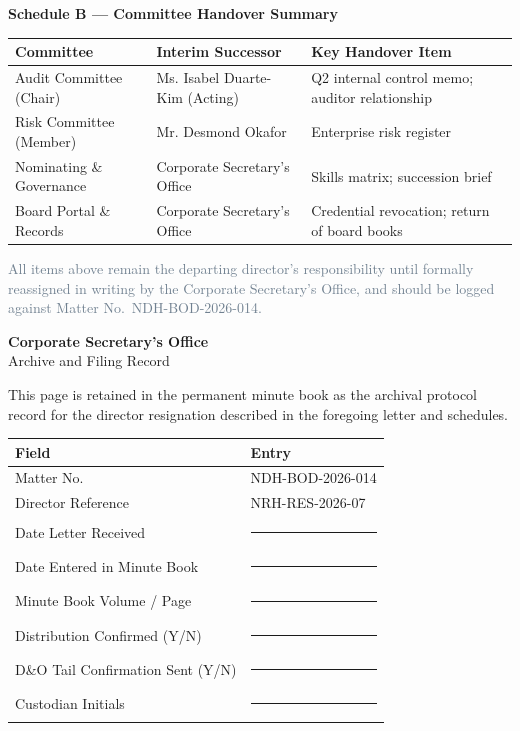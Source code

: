 \documentclass[english,11pt]{g-brief}
\begin{document}
\vspace{4mm}
\begin{center}
{\color{BoardNavy}\Large\bfseries Schedule B --- Committee Handover Summary}
\end{center}
\vspace{1.5mm}
\small
\begin{tabularx}{\textwidth}{@{}l l X@{}}
\toprule
\textbf{Committee} & \textbf{Interim Successor} & \textbf{Key Handover Item} \\
\midrule
Audit Committee (Chair) & Ms. Isabel Duarte-Kim (Acting) & Q2 internal control memo; auditor relationship \\{}
Risk Committee (Member) & Mr. Desmond Okafor & Enterprise risk register \\{}
Nominating \& Governance & Corporate Secretary's Office & Skills matrix; succession brief \\{}
Board Portal \& Records & Corporate Secretary's Office & Credential revocation; return of board books \\
\bottomrule
\end{tabularx}
\vspace{2mm}
\textcolor{SlateGray}{\footnotesize All items above remain the departing director's responsibility until formally reassigned in writing by the Corporate Secretary's Office, and should be logged against Matter No.\ NDH-BOD-2026-014.}

\newpage
\thispagestyle{regularpage}

\begin{center}
{\color{BoardNavy}\Huge\bfseries Corporate Secretary's Office}\\[2mm]
{\color{SlateGray}\Large Archive and Filing Record}
\end{center}

\vspace{6mm}

\textcolor{DarkText}{This page is retained in the permanent minute book as the archival protocol record for the director resignation described in the foregoing letter and schedules.}

\vspace{5mm}
\small
\begin{tabularx}{\textwidth}{@{}l X@{}}
\rowcolor{ParchmentBG}
\textbf{Field} & \textbf{Entry} \\
\midrule
Matter No. & NDH-BOD-2026-014 \\{}
Director Reference & NRH-RES-2026-07 \\{}
Date Letter Received & \rule{4cm}{0.4pt} \\{}
Date Entered in Minute Book & \rule{4cm}{0.4pt} \\{}
Minute Book Volume / Page & \rule{4cm}{0.4pt} \\{}
Distribution Confirmed (Y/N) & \rule{4cm}{0.4pt} \\{}
D\&O Tail Confirmation Sent (Y/N) & \rule{4cm}{0.4pt} \\{}
Custodian Initials & \rule{4cm}{0.4pt} \\
\bottomrule
\end{tabularx}
\end{document}
